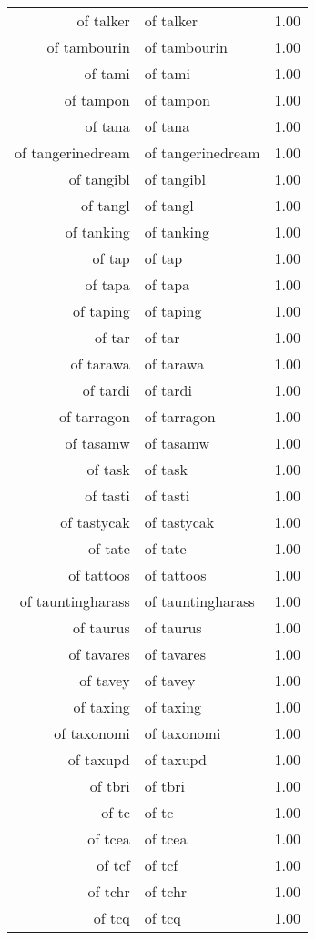 \begin{table}[ht]
\begin{tabular}{rlr}
  of talker & of talker & 1.00 \\ 
  of tambourin & of tambourin & 1.00 \\ 
  of tami & of tami & 1.00 \\ 
  of tampon & of tampon & 1.00 \\ 
  of tana & of tana & 1.00 \\ 
  of tangerinedream & of tangerinedream & 1.00 \\ 
  of tangibl & of tangibl & 1.00 \\ 
  of tangl & of tangl & 1.00 \\ 
  of tanking & of tanking & 1.00 \\ 
  of tap & of tap & 1.00 \\ 
  of tapa & of tapa & 1.00 \\ 
  of taping & of taping & 1.00 \\ 
  of tar & of tar & 1.00 \\ 
  of tarawa & of tarawa & 1.00 \\ 
  of tardi & of tardi & 1.00 \\ 
  of tarragon & of tarragon & 1.00 \\ 
  of tasamw & of tasamw & 1.00 \\ 
  of task & of task & 1.00 \\ 
  of tasti & of tasti & 1.00 \\ 
  of tastycak & of tastycak & 1.00 \\ 
  of tate & of tate & 1.00 \\ 
  of tattoos & of tattoos & 1.00 \\ 
  of tauntingharass & of tauntingharass & 1.00 \\ 
  of taurus & of taurus & 1.00 \\ 
  of tavares & of tavares & 1.00 \\ 
  of tavey & of tavey & 1.00 \\ 
  of taxing & of taxing & 1.00 \\ 
  of taxonomi & of taxonomi & 1.00 \\ 
  of taxupd & of taxupd & 1.00 \\ 
  of tbri & of tbri & 1.00 \\ 
  of tc & of tc & 1.00 \\ 
  of tcea & of tcea & 1.00 \\ 
  of tcf & of tcf & 1.00 \\ 
  of tchr & of tchr & 1.00 \\ 
  of tcq & of tcq & 1.00 \\ 

\end{tabular}
\end{table}
